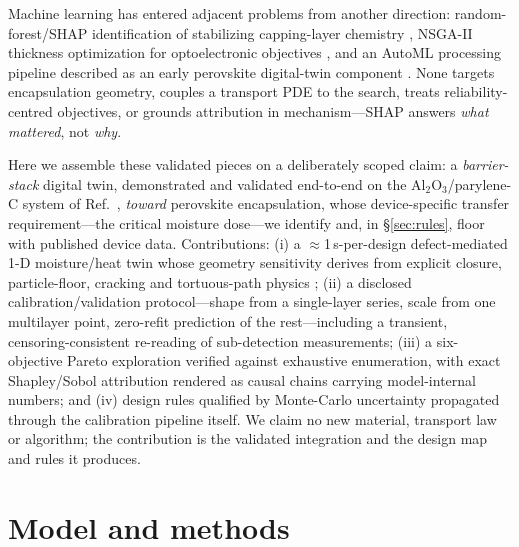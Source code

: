 \documentclass[11pt]{article}
\begin{document}
Machine learning has entered adjacent problems from another direction: random-forest/SHAP identification of stabilizing capping-layer chemistry \cite{hartono2020}, NSGA-II thickness optimization for optoelectronic objectives \cite{gaas2021,moulebhar2025}, and an AutoML processing pipeline described as an early perovskite digital-twin component \cite{automl2024}. None targets encapsulation geometry, couples a transport PDE to the search, treats reliability-centred objectives, or grounds attribution in mechanism---SHAP answers \emph{what mattered}, not \emph{why}.

Here we assemble these validated pieces on a deliberately scoped claim: a \emph{barrier-stack} digital twin, demonstrated and validated end-to-end on the Al$_2$O$_3$/parylene-C system of Ref.~\cite{wu2018}, \emph{toward} perovskite encapsulation, whose device-specific transfer requirement---the critical moisture dose---we identify and, in \S\ref{sec:rules}, floor with published device data. Contributions: (i) a $\approx$1\,s-per-design defect-mediated 1-D moisture/heat twin whose geometry sensitivity derives from explicit closure, particle-floor, cracking and tortuous-path physics \cite{graff2004,rossi1993,dasilva2000}; (ii) a disclosed calibration/validation protocol---shape from a single-layer series, scale from one multilayer point, zero-refit prediction of the rest---including a transient, censoring-consistent re-reading of sub-detection measurements; (iii) a six-objective Pareto exploration verified against exhaustive enumeration, with exact Shapley/Sobol attribution rendered as causal chains carrying model-internal numbers; and (iv) design rules qualified by Monte-Carlo uncertainty propagated through the calibration pipeline itself. We claim no new material, transport law or algorithm; the contribution is the validated integration and the design map and rules it produces.

\section{Model and methods}
\end{document}
